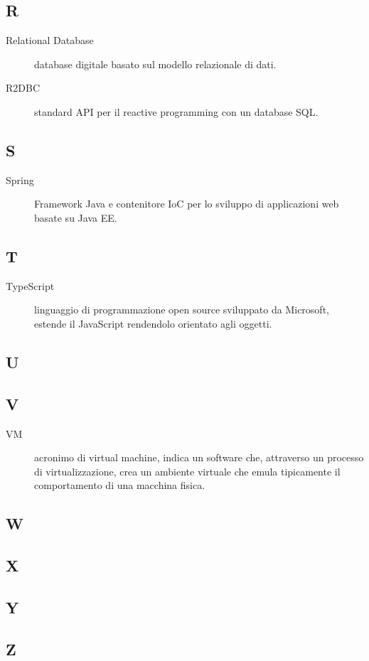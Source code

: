 \documentclass[../../../analisi-dei-requisiti.tex]{subfiles}
\begin{document}
\subsection{R}

\begin{description}
    \item[Relational Database] database digitale basato sul modello relazionale di dati.
    \item[R2DBC] standard API per il reactive programming con un database SQL\@.
\end{description}

\subsection{S}

\begin{description}
    \item[Spring] Framework Java e contenitore IoC per lo sviluppo di applicazioni web basate su Java EE\@.
\end{description}

\subsection{T}

\begin{description}
    \item[TypeScript] linguaggio di programmazione open source sviluppato da Microsoft, estende il JavaScript rendendolo orientato agli oggetti.
\end{description}

\subsection{U}

\subsection{V}

\begin{description}
    \item[VM] acronimo di virtual machine, indica un software che, attraverso un processo di virtualizzazione, crea un ambiente virtuale che emula tipicamente il comportamento di una macchina fisica.
\end{description}

\subsection{W}

\subsection{X}

\subsection{Y}

\subsection{Z}
\end{document}
